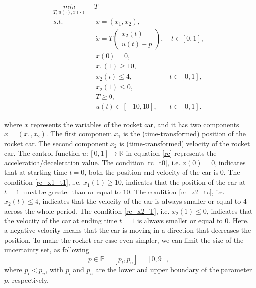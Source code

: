 \documentclass  [
  paper    = a4,
  BCOR     = 10mm,
  twoside,
  fontsize = 12pt,
  fleqn,
  toc      = bibnumbered,
  toc      = listofnumbered,
  numbers  = noendperiod,
  headings = normal,
  listof   = leveldown,
  version  = 3.03
]                                       {scrreprt}
\newcommand{\<}{\langle}
\renewcommand{\>}{\rangle}
\begin{document}
\begin{subequations}
	\begin{align}
		\underset{T, u(\cdot), x(\cdot)}{min} \   & \  T \\ 
		s.t.  & \ \ x = (x_1, x_2),   \label{rc_x} \\ 
		& \ \  \dot{x} = T  \begin{pmatrix}  x_2(t) \\ u(t)-p   \end{pmatrix}, & \ t \in [0,1],  \label{rc_partial} \\
		& \ \ x(0) = 0, \label{rc_t0}\\
		& \ \ x_1(1) \geq 10, \label{rc_x1_t1} \\
		& \ \ x_2(t) \leq 4, & t \in [0,1], \label{rc_x2_tc} \\
		& \ \ x_2(1) \leq 0, \label{rc_x2_T}  \\
		& \ \ T \geq 0, \\
		& \ \ u(t) \in [-10, 10], & t \in [0,1]. 
	\end{align}
	\label{rc}
\end{subequations}

where $x$ represents the variables of the rocket car, and it has two components $ x = (x_1, x_2)$. The first component $x_1$ is the (time-transformed) position of the rocket car. The second component $x_2$ is (time-transformed) velocity of the rocket car. The control function $ u: [0,1] \rightarrow \mathbb{R}$ in equation \ref{rc} represents the acceleration/deceleration value. The condition \ref{rc_t0}, i.e. $x(0) = 0$, indicates that at starting time $t=0$, both the position and velocity of the car is $0$. The condition \ref{rc_x1_t1}, i.e. $x_1(1) \geq 10$, indicates that the position of the car at $t=1$ must be greater than or equal to $10$. The condition \ref{rc_x2_tc}, i.e. $x_2(t) \leq 4$, indicates that the velocity of the car is always smaller or equal to 4 across the whole period. The condition \ref{rc_x2_T}, i.e. $x_2(1) \leq 0$, indicates that the velocity of the car at ending time $t=1$ is always smaller or equal to $0$.  Here, a negative velocity means that the car is moving in a direction that decreases the position.  To make the rocket car case even simpler, we can limit the size of the uncertainty set, as following
\begin{equation}
	p \in \mathbb{P} = [p_l, p_u] = [0,9],
	\label{uncertainP}
\end{equation}
where $p_l < p_u$, with $p_l$ and $p_u$ are the lower and upper boundary of the parameter $p$, respectively. 
\end{document}
